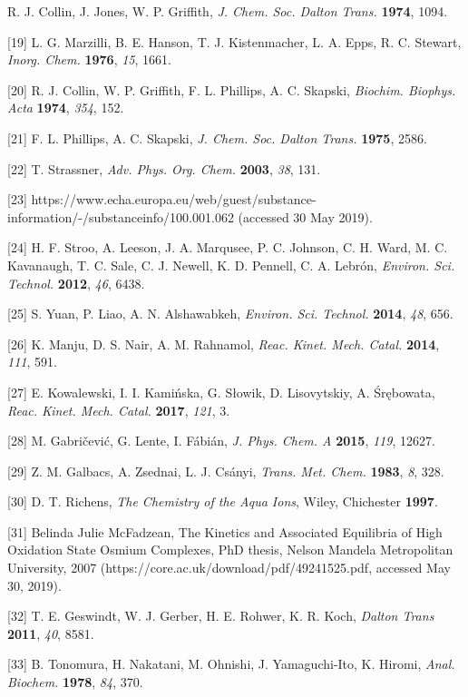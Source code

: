 \documentclass{article}
\begin{document}
\begin{hangpars}
[18] R. J. Collin, J. Jones, W. P. Griffith, \emph{J. Chem. Soc. Dalton Trans.} \textbf{1974}, 1094.

[19] L. G. Marzilli, B. E. Hanson, T. J. Kistenmacher, L. A. Epps, R. C. Stewart, \emph{Inorg. Chem.} \textbf{1976}, \emph{15}, 1661.

[20] R. J. Collin, W. P. Griffith, F. L. Phillips, A. C. Skapski, \emph{Biochim. Biophys. Acta} \textbf{1974}, \emph{354}, 152.

[21] F. L. Phillips, A. C. Skapski, \emph{J. Chem. Soc. Dalton Trans.} \textbf{1975}, 2586.

[22] T. Strassner, \emph{Adv. Phys. Org. Chem.} \textbf{2003}, \emph{38}, 131.

[23] https://www.echa.europa.eu/web/guest/substance-information/-/substanceinfo/100.001.062 (accessed 30 May 2019).

[24] H. F. Stroo, A. Leeson, J. A. Marqusee, P. C. Johnson, C. H. Ward, M. C. Kavanaugh, T. C. Sale, C. J. Newell, K. D. Pennell, C. A. Lebrón, \emph{Environ. Sci. Technol.} \textbf{2012}, \emph{46}, 6438.

[25] S. Yuan, P. Liao, A. N. Alshawabkeh, \emph{Environ. Sci. Technol.} \textbf{2014}, \emph{48}, 656.

[26] K. Manju, D. S. Nair, A. M. Rahnamol, \emph{Reac. Kinet. Mech. Catal.} \textbf{2014}, \emph{111}, 591.

[27] E. Kowalewski, I. I. Kamińska, G. Słowik, D. Lisovytskiy, A. Śrębowata, \emph{Reac. Kinet. Mech. Catal.} \textbf{2017}, \emph{121}, 3.

[28] M. Gabričević, G. Lente, I. Fábián, \emph{J. Phys. Chem. A} \textbf{2015}, \emph{119}, 12627.

[29] Z. M. Galbacs, A. Zsednai, L. J. Csányi, \emph{Trans. Met. Chem.} \textbf{1983}, \emph{8}, 328.

[30] D. T. Richens, \emph{The Chemistry of the Aqua Ions}, Wiley, Chichester \textbf{1997}.

[31] Belinda Julie McFadzean, The Kinetics and Associated Equilibria of High Oxidation State Osmium Complexes, PhD thesis, Nelson Mandela Metropolitan University, 2007 (https://core.ac.uk/download/pdf/49241525.pdf, accessed May 30, 2019).

[32] T. E. Geswindt, W. J. Gerber, H. E. Rohwer, K. R. Koch, \emph{Dalton Trans} \textbf{2011}, \emph{40}, 8581.

[33] B. Tonomura, H. Nakatani, M. Ohnishi, J. Yamaguchi-Ito, K. Hiromi, \emph{Anal. Biochem.} \textbf{1978}, \emph{84}, 370.


\end{hangpars}
\end{document}
